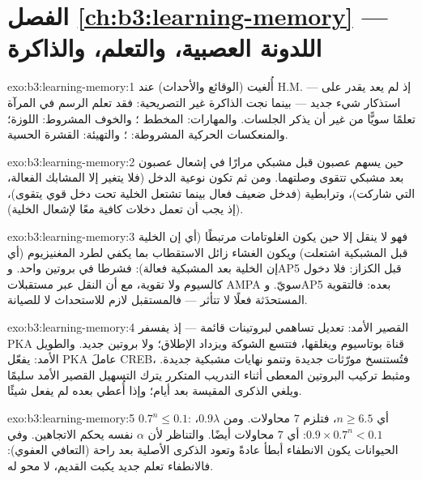 \section*{الفصل \ref{ch:b3:learning-memory} --- اللدونة العصبية، والتعلم، والذاكرة}

\begin{solution}{exo:b3:learning-memory:1}
أُلغيت  (الوقائع والأحداث) عند H.M. --- إذ
لم يعد يقدر على استذكار شيء جديد --- بينما نجت الذاكرة غير
التصريحية: فقد تعلم الرسم في المرآة تعلمًا سويًّا من غير أن
يذكر الجلسات. والمهارات: المخطط ؛ والخوف المشروط:
اللوزة؛ والمنعكسات الحركية المشروطة: ؛ والتهيئة:
القشرة الحسية.
\end{solution}

\begin{solution}{exo:b3:learning-memory:2}
حين يسهم عصبون قبل مشبكي مرارًا في إشعال عصبون بعد مشبكي
تتقوى وصلتهما. ومن ثم تكون  نوعية الدخل
(فلا يتغير إلا المشابك الفعالة، التي شاركت)، وترابطية (فدخل
ضعيف فعال بينما تشتعل الخلية تحت دخل قوي يتقوى)، 
(إذ يجب أن تعمل دخلات كافية معًا لإشعال الخلية).
\end{solution}

\begin{solution}{exo:b3:learning-memory:3}
فهو لا ينقل إلا حين يكون الغلوتامات مرتبطًا (أي إن الخلية
قبل المشبكية اشتعلت) \emph{و}يكون الغشاء زائل الاستقطاب بما
يكفي لطرد المغنيزيوم (أي إن الخلية بعد المشبكية فعالة):
فشرطا  في بروتين واحد. وAP5 قبل الكزاز: فلا دخول
كالسيوم ولا تقوية، مع أن النقل عبر مستقبلات AMPA سويّ. وAP5
بعده: فالتقوية المستحدَثة فعلًا لا تتأثر --- فالمستقبل لازم
للاستحداث لا للصيانة.
\end{solution}

\begin{solution}{exo:b3:learning-memory:4}
القصير الأمد: تعديل تساهمي لبروتينات قائمة --- إذ يفسفر PKA
قناة بوتاسيوم ويغلقها، فتتسع الشوكة ويزداد الإطلاق؛ ولا
بروتين جديد. والطويل الأمد: يفعّل PKA عاملَ CREB، فتُستنسخ
مورّثات جديدة وتنمو نهايات مشبكية جديدة. ومثبط تركيب
البروتين المعطى أثناء التدريب المتكرر يترك التسهيل القصير
الأمد سليمًا ويلغي الذكرى المقيسة بعد أيام؛ وإذا أُعطي
بعده لم يفعل شيئًا.
\end{solution}

\begin{solution}{exo:b3:learning-memory:5}
$0.7^{n} \le 0.1$: أي $n \ge 6.5$، فتلزم $7$ محاولات. ومن $0.9\lambda$،
$0.9\times 0.7^{n} < 0.1$: أي $7$ محاولات أيضًا. والتناظر لأن
$\alpha$ نفسه يحكم الاتجاهين. وفي الحيوانات يكون الانطفاء
أبطأ عادةً وتعود الذكرى الأصلية بعد راحة (التعافي العفوي):
فالانطفاء تعلم جديد يكبت القديم، لا محو له.
\end{solution}

